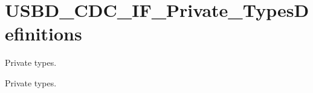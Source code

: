 \hypertarget{group__USBD__CDC__IF__Private__TypesDefinitions}{}\section{U\+S\+B\+D\+\_\+\+C\+D\+C\+\_\+\+I\+F\+\_\+\+Private\+\_\+\+Types\+Definitions}
\label{group__USBD__CDC__IF__Private__TypesDefinitions}


Private types.  


Private types. 

